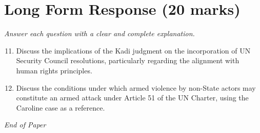 \documentclass[12pt]{article}
\begin{document}
\section*{Long Form Response (20 marks)}
\textit{Answer each question with a clear and complete explanation.}
\begin{enumerate}[label=\arabic*.]
\setcounter{enumi}{10}
\item Discuss the implications of the Kadi judgment on the incorporation of UN Security Council resolutions, particularly regarding the alignment with human rights principles.
\item Discuss the conditions under which armed violence by non-State actors may constitute an armed attack under Article 51 of the UN Charter, using the Caroline case as a reference.
\end{enumerate}

\vfill
\noindent\textit{End of Paper}
\end{document}
